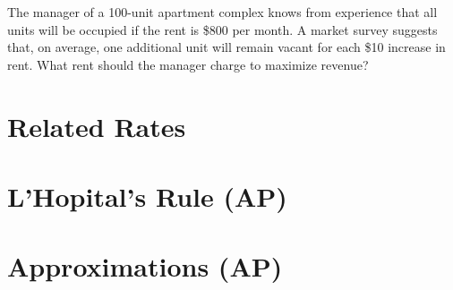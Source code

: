 \documentclass[12pt,fleqn]{book} %
\begin{document}
\vspace*{5mm}


\noindent\small{The manager of a 100-unit apartment complex knows from experience that all units will be occupied if the rent is \$800 per month. A market survey suggests
    that, on average, one additional unit will remain vacant for each \$10 increase in rent. What rent should the manager charge to maximize revenue?}

\section{Related Rates}

\section{L'Hopital's Rule (AP)}

\section{Approximations (AP)}
\end{document}
